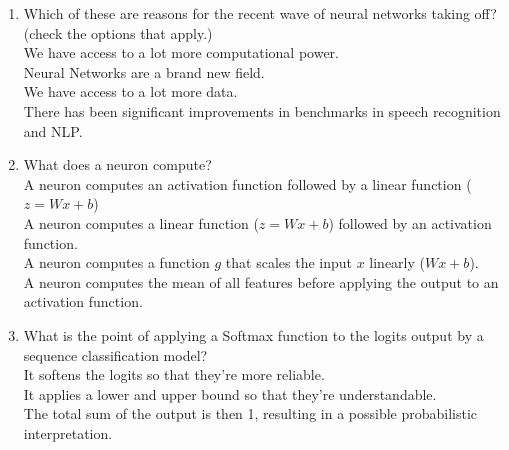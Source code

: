 \begin{enumerate}
    \item Which of these are reasons for the recent wave of neural networks taking off? (check the options that apply.) \\ 
        \hspace{1cm}\choice{\checkmark} We have access to a lot more computational power.\\
        \hspace{1cm}\choice{} Neural Networks are a brand new field.\\
        \hspace{1cm}\choice{\checkmark} We have access to a lot more data.\\
        \hspace{1cm}\choice{\checkmark} There has been significant improvements in benchmarks in speech recognition and NLP.\\
        \solution{}
    \item What does a neuron compute? \\ 
        \hspace{1cm}\choice{} A neuron computes an activation function followed by a linear function ($z = Wx + b$)\\
        \hspace{1cm}\choice{\checkmark} A neuron computes a linear function ($z = Wx + b$) followed by an activation function.\\
        \hspace{1cm}\choice{} A neuron computes a function $g$ that scales the input $x$ linearly ($Wx + b$).\\
        \hspace{1cm}\choice{} A neuron computes the mean of all features before applying the output to an activation function.\\
        \solution{}

    \item  What is the point of applying a Softmax function to the logits output by a sequence classification model? \\ 
        \hspace{1cm}\choice{} It softens the logits so that they're more reliable. \\ 
        \hspace{1cm}\choice{} It applies a lower and upper bound so that they're understandable. \\ 
        \hspace{1cm}\choice{\checkmark} The total sum of the output is then 1, resulting in a possible probabilistic interpretation.\\
        \solution{}
    
\end{enumerate}

